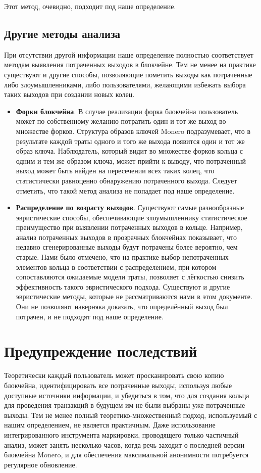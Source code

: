 \documentclass{mrl}
\begin{document}
Этот метод, очевидно, подходит под наше определение.

\subsection{Другие методы анализа}
При отсутствии другой информации наше определение полностью соответствует методам выявления потраченных выходов в блокчейне. Тем не менее на практике существуют и другие способы, позволяющие пометить выходы как потраченные либо злоумышленниками, либо пользователями, желающими избежать выбора таких выходов при создании новых колец.

\begin{itemize}
\item \textbf{Форки блокчейна}. В случае реализации форка блокчейна пользователь может по собственному желанию потратить один и тот же выход во множестве форков. Структура образов ключей Monero подразумевает, что в результате каждой траты одного и того же выхода появится один и тот же образ ключа. Наблюдатель, который видит во множестве форков кольца с одним и тем же образом ключа, может прийти к выводу, что потраченный выход может быть найден на пересечении всех таких колец, что статистически равноценно обнаружению потраченного выхода. Следует отметить, что такой метод анализа не попадает под наше определение.
\item \textbf{Распределение по возрасту выходов}. Существуют самые разнообразные эвристические способы, обеспечивающие злоумышленнику статистическое преимущество при выявлении потраченных выходов в кольце. Например, анализ потраченных выходов в прозрачных блокчейнах показывает, что недавно сгенерированные выходы будут потрачены более вероятно, чем старые. Нами было отмечено, что на практике выбор непотраченных элементов кольца в соответствии с распределением, при котором сопоставляются ожидаемые модели траты, позволяет с лёгкостью снизить эффективность такого эвристического подхода. Существуют и другие эвристические методы, которые не рассматриваются нами в этом документе. Они не позволяют наверняка доказать, что определённый выход был потрачен, и не подходят под наше определение.
\end{itemize}

\section{Предупреждение последствий}
Теоретически каждый пользователь может просканировать свою копию блокчейна, идентифицировать все потраченные выходы, используя любые доступные источники информации, и убедиться в том, что для создания кольца для проведения транзакций в будущем им не были выбраны уже потраченные выходы. Тем не менее полный теоретико-множественный подход, используемый с нашим определением, не является практичным. Даже использование интегрированного инструмента маркировки, проводящего только частичный анализ, может занять несколько часов, когда речь заходит о последней версии блокчейна Monero, и для обеспечения максимальной анонимности потребуется регулярное обновление.
\end{document}
